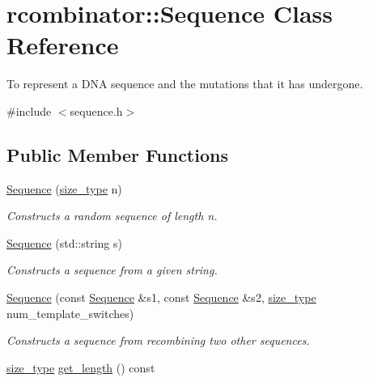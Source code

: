 \hypertarget{classrcombinator_1_1Sequence}{}\section{rcombinator\+:\+:Sequence Class Reference}
\label{classrcombinator_1_1Sequence}


To represent a D\+NA sequence and the mutations that it has undergone.  




{\ttfamily \#include $<$sequence.\+h$>$}

\subsection*{Public Member Functions}
\begin{DoxyCompactItemize}
\item 
\mbox{\hyperlink{classrcombinator_1_1Sequence_a04d0d6977316f2ab30844e584c4531ec}{Sequence}} (\mbox{\hyperlink{constants_8h_abcd18a5521fc90ff6e7b00e4fee98397}{size\+\_\+type}} n)
\begin{DoxyCompactList}\small\item\em Constructs a random sequence of length {\itshape n}. \end{DoxyCompactList}\item 
\mbox{\hyperlink{classrcombinator_1_1Sequence_af5b3b62eba07f0e09f532fcf1681c289}{Sequence}} (std\+::string s)
\begin{DoxyCompactList}\small\item\em Constructs a sequence from a given string. \end{DoxyCompactList}\item 
\mbox{\hyperlink{classrcombinator_1_1Sequence_af334c44bea806196b5037e61b0e831b1}{Sequence}} (const \mbox{\hyperlink{classrcombinator_1_1Sequence}{Sequence}} \&s1, const \mbox{\hyperlink{classrcombinator_1_1Sequence}{Sequence}} \&s2, \mbox{\hyperlink{constants_8h_abcd18a5521fc90ff6e7b00e4fee98397}{size\+\_\+type}} num\+\_\+template\+\_\+switches)
\begin{DoxyCompactList}\small\item\em Constructs a sequence from recombining two other sequences. \end{DoxyCompactList}\item 
\mbox{\label{classrcombinator_1_1Sequence_a743beee42a3f42eb30e0988016d74bb4}} 
\mbox{\hyperlink{constants_8h_abcd18a5521fc90ff6e7b00e4fee98397}{size\+\_\+type}} \mbox{\hyperlink{classrcombinator_1_1Sequence_a743beee42a3f42eb30e0988016d74bb4}{get\+\_\+length}} () const

\end{DoxyCompactItemize}
